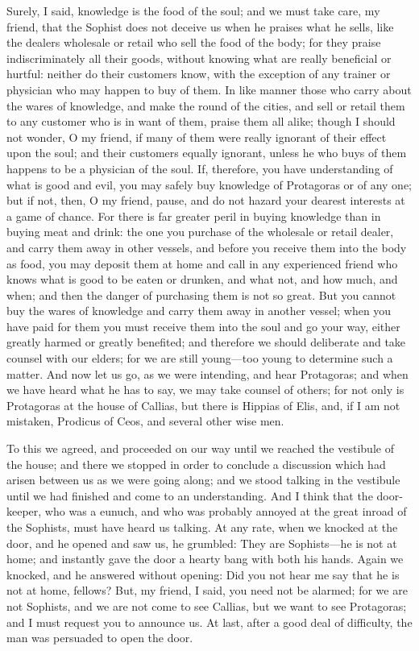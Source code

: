 \documentclass[11pt,letter]{article}
\begin{document}
\par  Surely, I said, knowledge is the food of the soul; and we must take care, my friend, that the Sophist does not deceive us when he praises what he sells, like the dealers wholesale or retail who sell the food of the body; for they praise indiscriminately all their goods, without knowing what are really beneficial or hurtful: neither do their customers know, with the exception of any trainer or physician who may happen to buy of them. In like manner those who carry about the wares of knowledge, and make the round of the cities, and sell or retail them to any customer who is in want of them, praise them all alike; though I should not wonder, O my friend, if many of them were really ignorant of their effect upon the soul; and their customers equally ignorant, unless he who buys of them happens to be a physician of the soul. If, therefore, you have understanding of what is good and evil, you may safely buy knowledge of Protagoras or of any one; but if not, then, O my friend, pause, and do not hazard your dearest interests at a game of chance. For there is far greater peril in buying knowledge than in buying meat and drink: the one you purchase of the wholesale or retail dealer, and carry them away in other vessels, and before you receive them into the body as food, you may deposit them at home and call in any experienced friend who knows what is good to be eaten or drunken, and what not, and how much, and when; and then the danger of purchasing them is not so great. But you cannot buy the wares of knowledge and carry them away in another vessel; when you have paid for them you must receive them into the soul and go your way, either greatly harmed or greatly benefited; and therefore we should deliberate and take counsel with our elders; for we are still young—too young to determine such a matter. And now let us go, as we were intending, and hear Protagoras; and when we have heard what he has to say, we may take counsel of others; for not only is Protagoras at the house of Callias, but there is Hippias of Elis, and, if I am not mistaken, Prodicus of Ceos, and several other wise men.

\par  To this we agreed, and proceeded on our way until we reached the vestibule of the house; and there we stopped in order to conclude a discussion which had arisen between us as we were going along; and we stood talking in the vestibule until we had finished and come to an understanding. And I think that the door-keeper, who was a eunuch, and who was probably annoyed at the great inroad of the Sophists, must have heard us talking. At any rate, when we knocked at the door, and he opened and saw us, he grumbled: They are Sophists—he is not at home; and instantly gave the door a hearty bang with both his hands. Again we knocked, and he answered without opening: Did you not hear me say that he is not at home, fellows? But, my friend, I said, you need not be alarmed; for we are not Sophists, and we are not come to see Callias, but we want to see Protagoras; and I must request you to announce us. At last, after a good deal of difficulty, the man was persuaded to open the door.
\end{document}
